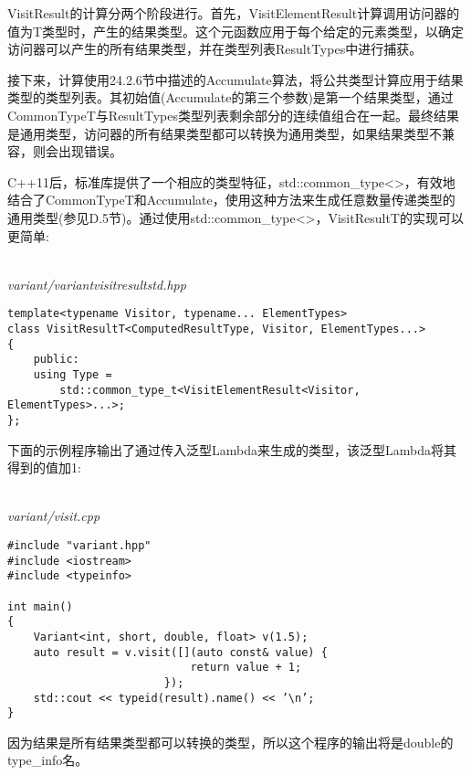 VisitResult的计算分两个阶段进行。首先，VisitElementResult计算调用访问器的值为T类型时，产生的结果类型。这个元函数应用于每个给定的元素类型，以确定访问器可以产生的所有结果类型，并在类型列表ResultTypes中进行捕获。

接下来，计算使用24.2.6节中描述的Accumulate算法，将公共类型计算应用于结果类型的类型列表。其初始值(Accumulate的第三个参数)是第一个结果类型，通过CommonTypeT与ResultTypes类型列表剩余部分的连续值组合在一起。最终结果是通用类型，访问器的所有结果类型都可以转换为通用类型，如果结果类型不兼容，则会出现错误。

C++11后，标准库提供了一个相应的类型特征，std::common\_type<>，有效地结合了CommonTypeT和Accumulate，使用这种方法来生成任意数量传递类型的通用类型(参见D.5节)。通过使用std::common\_type<>，VisitResultT的实现可以更简单:

\hspace*{\fill} \\ %
\noindent
\textit{variant/variantvisitresultstd.hpp}
\begin{lstlisting}[style=styleCXX]
template<typename Visitor, typename... ElementTypes>
class VisitResultT<ComputedResultType, Visitor, ElementTypes...>
{
	public:
	using Type =
		std::common_type_t<VisitElementResult<Visitor, ElementTypes>...>;
};
\end{lstlisting}

下面的示例程序输出了通过传入泛型Lambda来生成的类型，该泛型Lambda将其得到的值加1:

\hspace*{\fill} \\ %
\noindent
\textit{variant/visit.cpp}
\begin{lstlisting}[style=styleCXX]
#include "variant.hpp"
#include <iostream>
#include <typeinfo>

int main()
{
	Variant<int, short, double, float> v(1.5);
	auto result = v.visit([](auto const& value) {
							return value + 1;
						});
	std::cout << typeid(result).name() << ’\n’;
}
\end{lstlisting}

因为结果是所有结果类型都可以转换的类型，所以这个程序的输出将是double的type\_info名。







